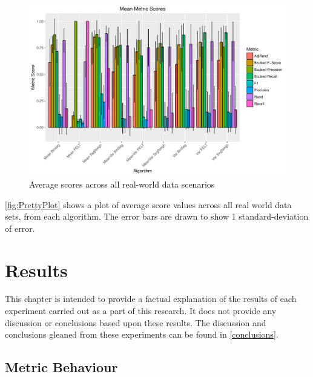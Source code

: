 \documentclass{uvamscse}	%
\begin{document}
\begin{figure}[h]
    \includegraphics[width=\textwidth]{figures/PrettyPlot}
    \caption{Average scores across all real-world data scenarios}
    \label{fig:PrettyPlot}
\end{figure}



\autoref{fig:PrettyPlot} shows a plot of average score values across all real world data sets, from each algorithm. The error bars are drawn to show 1 standard-deviation of error.



\chapter{Results}
\label{results}

This chapter is intended to provide a factual explanation of the results of each experiment carried out as a part of this research. It does not provide any discussion or conclusions based upon these results. The discussion and conclusions gleaned from these experiments can be found in \autoref{conclusions}.

\section{Metric Behaviour}
\end{document}
